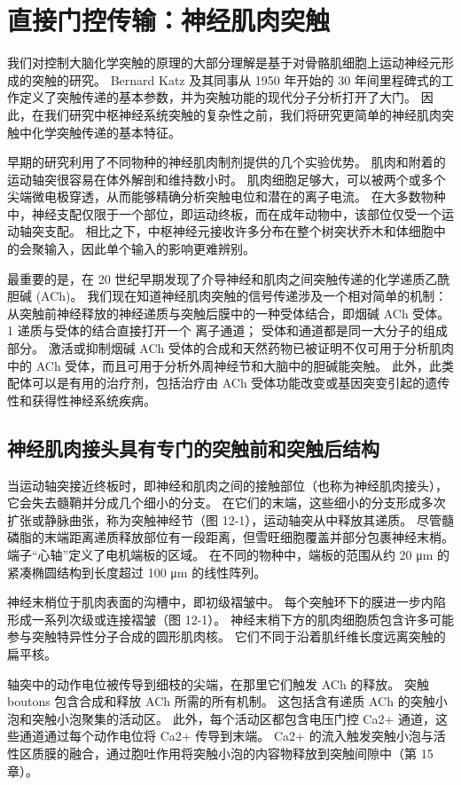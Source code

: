\chapter{直接门控传输：神经肌肉突触} \label{chap:chap12}

我们对控制大脑化学突触的原理的大部分理解是基于对骨骼肌细胞上运动神经元形成的突触的研究。 Bernard Katz 及其同事从 1950 年开始的 30 年间里程碑式的工作定义了突触传递的基本参数，并为突触功能的现代分子分析打开了大门。 因此，在我们研究中枢神经系统突触的复杂性之前，我们将研究更简单的神经肌肉突触中化学突触传递的基本特征。

早期的研究利用了不同物种的神经肌肉制剂提供的几个实验优势。 肌肉和附着的运动轴突很容易在体外解剖和维持数小时。 肌肉细胞足够大，可以被两个或多个尖端微电极穿透，从而能够精确分析突触电位和潜在的离子电流。 在大多数物种中，神经支配仅限于一个部位，即运动终板，而在成年动物中，该部位仅受一个运动轴突支配。 相比之下，中枢神经元接收许多分布在整个树突状乔木和体细胞中的会聚输入，因此单个输入的影响更难辨别。

最重要的是，在 20 世纪早期发现了介导神经和肌肉之间突触传递的化学递质乙酰胆碱 (ACh)。 我们现在知道神经肌肉突触的信号传递涉及一个相对简单的机制：从突触前神经释放的神经递质与突触后膜中的一种受体结合，即烟碱 ACh 受体。1 递质与受体的结合直接打开一个 离子通道； 受体和通道都是同一大分子的组成部分。 激活或抑制烟碱 ACh 受体的合成和天然药物已被证明不仅可用于分析肌肉中的 ACh 受体，而且可用于分析外周神经节和大脑中的胆碱能突触。 此外，此类配体可以是有用的治疗剂，包括治疗由 ACh 受体功能改变或基因突变引起的遗传性和获得性神经系统疾病。

\section{神经肌肉接头具有专门的突触前和突触后结构}
当运动轴突接近终板时，即神经和肌肉之间的接触部位（也称为神经肌肉接头），它会失去髓鞘并分成几个细小的分支。 在它们的末端，这些细小的分支形成多次扩张或静脉曲张，称为突触神经节（图 12-1），运动轴突从中释放其递质。 尽管髓磷脂的末端距离递质释放部位有一段距离，但雪旺细胞覆盖并部分包裹神经末梢。 端子“心轴”定义了电机端板的区域。 在不同的物种中，端板的范围从约 20 μm 的紧凑椭圆结构到长度超过 100 μm 的线性阵列。

神经末梢位于肌肉表面的沟槽中，即初级褶皱中。 每个突触环下的膜进一步内陷形成一系列次级或连接褶皱（图 12-1）。 神经末梢下方的肌肉细胞质包含许多可能参与突触特异性分子合成的圆形肌肉核。 它们不同于沿着肌纤维长度远离突触的扁平核。

轴突中的动作电位被传导到细枝的尖端，在那里它们触发 ACh 的释放。 突触 boutons 包含合成和释放 ACh 所需的所有机制。 这包括含有递质 ACh 的突触小泡和突触小泡聚集的活动区。 此外，每个活动区都包含电压门控 Ca2+ 通道，这些通道通过每个动作电位将 Ca2+ 传导到末端。 Ca2+ 的流入触发突触小泡与活性区质膜的融合，通过胞吐作用将突触小泡的内容物释放到突触间隙中（第 15 章）。

